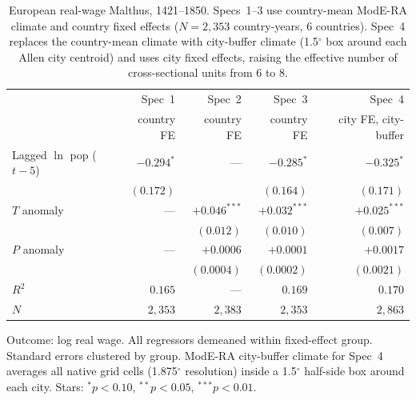 \documentclass[11pt,letterpaper]{article}
\begin{document}
\begin{table}[H]
\centering
\caption{European real-wage Malthus, 1421--1850. Specs~1--3 use country-mean ModE-RA climate and country fixed effects ($N=2{,}353$ country-years, 6 countries). Spec~4 replaces the country-mean climate with city-buffer climate (1.5$^\circ$ box around each Allen city centroid) and uses city fixed effects, raising the effective number of cross-sectional units from 6 to 8.}
\label{tab:allen}
\small
\begin{tabular}{lrrrr}
\toprule
                                     & Spec~1 & Spec~2 & Spec~3 & Spec~4 \\
                                     & country FE & country FE & country FE & city FE, city-buffer \\
\midrule
Lagged $\ln$ pop ($t-5$)             & $-0.294^{*}$  & ---            & $-0.285^{*}$    & $-0.325^{*}$    \\
                                     & $(0.172)$     &                & $(0.164)$       & $(0.171)$       \\
$T$ anomaly                          & ---           & $+0.046^{***}$ & $+0.032^{***}$  & $+0.025^{***}$  \\
                                     &               & $(0.012)$      & $(0.010)$       & $(0.007)$       \\
$P$ anomaly                          & ---           & $+0.0006$      & $+0.0001$       & $+0.0017$       \\
                                     &               & $(0.0004)$     & $(0.0002)$      & $(0.0021)$      \\
$R^2$                                & $0.165$       & ---            & $0.169$         & $0.170$         \\
$N$                                  & $2{,}353$     & $2{,}383$      & $2{,}353$       & $2{,}863$       \\
\bottomrule
\end{tabular}
\par\smallskip\footnotesize{Outcome: log real wage. All regressors demeaned within fixed-effect group. Standard errors clustered by group. ModE-RA city-buffer climate for Spec~4 averages all native grid cells (1.875$^\circ$ resolution) inside a 1.5$^\circ$ half-side box around each city. Stars: $^{*}p<0.10$, $^{**}p<0.05$, $^{***}p<0.01$.}
\end{table}
\end{document}
